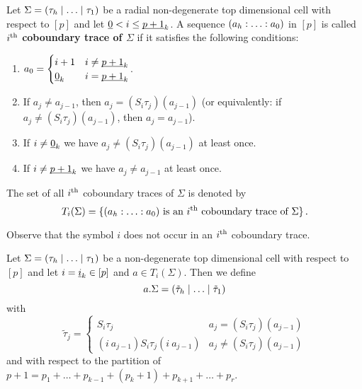\begin{defi}
    \label{cellular_models:dual_ehrenfried:cob_tr_radial}
    Let $\Sigma = \inhom$ be a radial non-degenerate top dimensional cell with respect to $[p]$ and let $\underline{\smash{0}} < i \le \underline{\smash{p+1}}_k$.
    A sequence $\homog[a]$ in $[p]$ is called $i^{\text{th}}$ {\bfseries coboundary trace of $\Sigma$} if it satisfies the following conditions:
    \begin{enumerate}
        \item \label{cellular_models:dual_ehrenfried:cob_tr_radial:normalization} $a_0 = \begin{cases}i+1& i \neq \underline{\smash{p+1}}_k \\ \underline{\smash{0}}_k & i = \underline{\smash{p+1}}_k\end{cases}$.
        \item \label{cellular_models:dual_ehrenfried:cob_tr_radial:choice} If $a_j \neq a_{j-1}$, then $a_j = (S_i\tau_j)(a_{j-1})$
                    (or equivalently: if $a_j \neq (S_i\tau_j)(a_{j-1})$, then $a_j = a_{j-1}$).
        \item \label{cellular_models:dual_ehrenfried:cob_tr_radial:i} If $i \neq \underline{\smash{0}}_k$ we have $a_j \neq (S_i\tau_j)(a_{j-1})$ at least once.
        \item \label{cellular_models:dual_ehrenfried:cob_tr_radial:i+1} If $i \neq \underline{\smash{p+1}}_k$ we have $a_j \neq a_{j-1}$ at least once.
    \end{enumerate}
    The set of all $i^{\text{th}}$ coboundary traces of $\Sigma$ is denoted by
    \[
        T_i(\Sigma) = \{ (a_h : \ldots : a_0) \text{ is an $i\Th$ coboundary trace of $\Sigma$} \} \,.
    \]    
\end{defi}


\begin{rem}
    \label{cellular_models:dual_ehrenfried:cob_tr_do_not_contain_i}
    Observe that the symbol $i$ does not occur in an $i^{\text{th}}$ coboundary trace.
\end{rem}

\begin{defi}
    \label{cellular_models:dual_ehrenfried:a_dot_sigma}
    Let $\Sigma = \inhom$ be a non-degenerate top dimensional cell with respect to $[p]$ and let $i = \underline{\smash{i}}_k \in [p]$ and $a \in T_i(\Sigma)$.
    Then we define
    \[
        a.\Sigma = \inhom[\tilde\tau]
    \]
    with
    \[
        \tilde\tau_j =
            \begin{cases}
                S_i\tau_j                               & a_j = (S_i\tau_j)(a_{j-1}) \\
                (i\ a_{j-1}) S_i\tau_j (i\ a_{j-1})     & a_j \neq (S_i\tau_j)(a_{j-1})
            \end{cases}
    \]
    and with respect to the partition of $p+1 = p_1 + \ldots + p_{k-1} + (p_k + 1 ) + p_{k+1} + \ldots + p_r$.
\end{defi}

